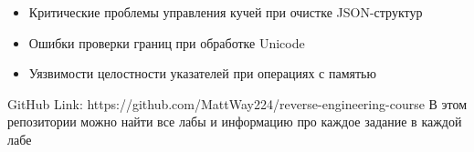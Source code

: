     \begin{itemize}
        \item Критические проблемы управления кучей при очистке JSON-структур
        \item Ошибки проверки границ при обработке Unicode
        \item Уязвимости целостности указателей при операциях с памятью
    \end{itemize}

    \begin{thebibliography}{1}
        GitHub Link: https://github.com/MattWay224/reverse-engineering-course
        В этом репозитории можно найти все лабы и информацию про каждое задание в каждой лабе
    \end{thebibliography}

